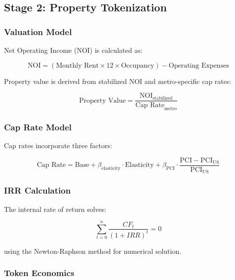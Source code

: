﻿\documentclass[12pt]{article}
\begin{document}
\subsection{Stage 2: Property Tokenization}

\subsubsection{Valuation Model}

Net Operating Income (NOI) is calculated as:

\begin{equation}
\text{NOI} = (\text{Monthly Rent} \times 12 \times \text{Occupancy}) - \text{Operating Expenses}
\label{eq:noi}
\end{equation}

Property value is derived from stabilized NOI and metro-specific cap rates:

\begin{equation}
\text{Property Value} = \frac{\text{NOI}_{\text{stabilized}}}{\text{Cap Rate}_{\text{metro}}}
\label{eq:value}
\end{equation}

\subsubsection{Cap Rate Model}

Cap rates incorporate three factors:

\begin{equation}
\text{Cap Rate} = \text{Base} + \beta_{\text{elasticity}} \cdot \text{Elasticity} + \beta_{\text{PCI}} \cdot \frac{\text{PCI} - \text{PCI}_{\text{US}}}{\text{PCI}_{\text{US}}}
\label{eq:caprate}
\end{equation}

\subsubsection{IRR Calculation}

The internal rate of return solves:

\begin{equation}
\sum_{t=0}^{n} \frac{CF_t}{(1 + IRR)^t} = 0
\label{eq:irr}
\end{equation}

using the Newton-Raphson method for numerical solution.

\subsubsection{Token Economics}
\end{document}
